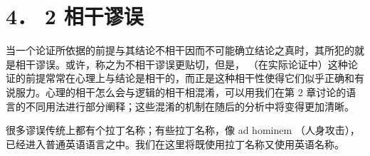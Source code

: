 \section*{4． 2 相干谬误}
当一个论证所依据的前提与其结论不相干因而不可能确立结论之真时，其所犯的就是相干谬误。或许，称之为不相干谬误更贴切，但是， （在实际论证中）这种论证的前提常常在心理上与结论是相干的，而正是这种相干性使得它们似乎正确和有说服力。心理的相干怎么会与逻辑的相干相混淆，可以用我们在第 2 章讨论的语言的不同用法进行部分阐释；这些混淆的机制在随后的分析中将变得更加清晰。

很多谬误传统上都有个拉丁名称；有些拉丁名称，像 ad hominem （人身攻击），已经进入普通英语语言之中。我们在这里将既使用拉丁名称又使用英语名称。 